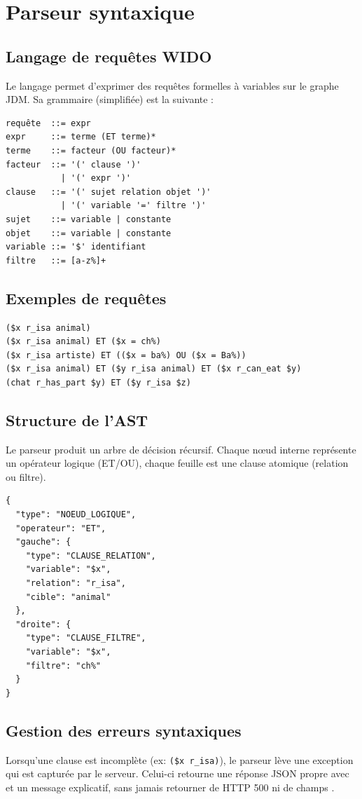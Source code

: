 \chapter{Parseur syntaxique}
\label{chap:parseur}

\section{Langage de requêtes WIDO}

Le langage \wido{} permet d'exprimer des requêtes formelles à variables sur le graphe JDM. Sa grammaire (simplifiée) est la suivante :

\begin{verbatim}
requête  ::= expr
expr     ::= terme (ET terme)*
terme    ::= facteur (OU facteur)*
facteur  ::= '(' clause ')'
           | '(' expr ')'
clause   ::= '(' sujet relation objet ')'
           | '(' variable '=' filtre ')'
sujet    ::= variable | constante
objet    ::= variable | constante
variable ::= '$' identifiant
filtre   ::= [a-z%]+
\end{verbatim}

\section{Exemples de requêtes}

\begin{lstlisting}[style=widoquery, caption=Exemples de requêtes WIDO]
($x r_isa animal)
($x r_isa animal) ET ($x = ch%)
($x r_isa artiste) ET (($x = ba%) OU ($x = Ba%))
($x r_isa animal) ET ($y r_isa animal) ET ($x r_can_eat $y)
(chat r_has_part $y) ET ($y r_isa $z)
\end{lstlisting}

\section{Structure de l'AST}

Le parseur produit un arbre de décision récursif. Chaque nœud interne représente un opérateur logique (ET/OU), chaque feuille est une clause atomique (relation ou filtre).

\begin{lstlisting}[caption=AST produit pour \texttt{(\$x r\_isa animal) ET (\$x = ch\%)}]
{
  "type": "NOEUD_LOGIQUE",
  "operateur": "ET",
  "gauche": {
    "type": "CLAUSE_RELATION",
    "variable": "$x",
    "relation": "r_isa",
    "cible": "animal"
  },
  "droite": {
    "type": "CLAUSE_FILTRE",
    "variable": "$x",
    "filtre": "ch%"
  }
}
\end{lstlisting}

\section{Gestion des erreurs syntaxiques}

Lorsqu'une clause est incomplète (ex: \texttt{(\$x r\_isa)}), le parseur lève une exception qui est capturée par le serveur. Celui-ci retourne une réponse JSON propre avec  et un message explicatif, sans jamais retourner de HTTP 500 ni de champs .
